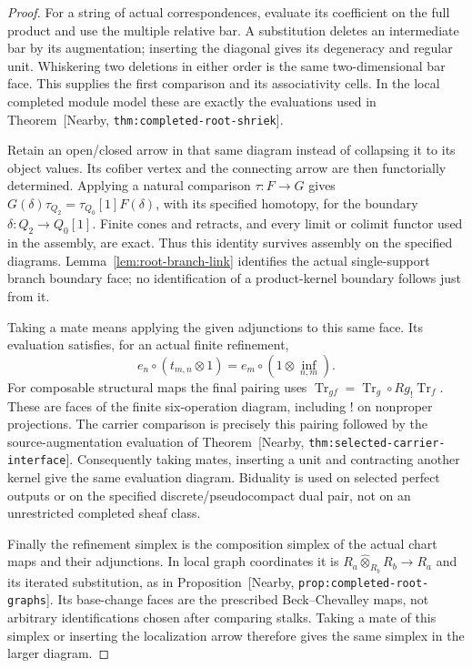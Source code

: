 \documentclass[11pt]{article}
\theoremstyle{definition}
\theoremstyle{remark}
\newcommand{\mainref}[1]{\textnormal{[Nearby, \nolinkurl{#1}]}}
\begin{document}
\begin{proof}
For a string of actual correspondences, evaluate its coefficient
on the full product and use the multiple relative bar.  A
substitution deletes an intermediate bar by its augmentation;
inserting the diagonal gives its degeneracy and regular unit.
Whiskering two deletions in either order is the same two-dimensional
bar face.  This supplies the first comparison and its associativity
cells.  In the local completed module model these are exactly the
evaluations used in Theorem~\mainref{thm:completed-root-shriek}.

Retain an open/closed arrow in that same diagram instead of
collapsing it to its object values.  Its cofiber vertex and the
connecting arrow are then functorially determined.  Applying a
natural comparison $\tau:F\to G$ gives
$G(\delta)\tau_{Q_2}=\tau_{Q_0}[1]F(\delta)$, with its specified
homotopy, for the boundary $\delta:Q_2\to Q_0[1]$.
Finite cones and retracts, and every limit or colimit functor used
in the assembly, are exact.  Thus this identity survives assembly
on the specified diagrams.  Lemma~\ref{lem:root-branch-link}
identifies the actual single-support branch boundary face; no
identification of a product-kernel boundary follows just from it.

Taking a mate means applying the given adjunctions to this same
face.  Its evaluation satisfies, for an actual finite refinement,
\[
 e_n\circ(t_{m,n}\otimes1)
       =e_m\circ(1\otimes\operatorname{inf}_{n,m}).
\]
For composable structural maps the final pairing uses
$\operatorname{Tr}_{gf}
=\operatorname{Tr}_g\circ Rg_!\operatorname{Tr}_f$.
These are faces of the finite six-operation diagram, including
$!$ on nonproper projections.  The carrier comparison is precisely
this pairing followed by the source-augmentation evaluation of
Theorem~\mainref{thm:selected-carrier-interface}.  Consequently taking
mates, inserting a unit and contracting another kernel give the
same evaluation diagram.  Biduality is used on selected perfect
outputs or on the specified discrete/pseudocompact dual pair, not
on an unrestricted completed sheaf class.

Finally the refinement simplex is the composition simplex of the
actual chart maps and their adjunctions.  In local graph coordinates
it is $R_a\widehat\otimes_{R_b}R_b\to R_a$ and its iterated
substitution, as in Proposition~\mainref{prop:completed-root-graphs}.
Its base-change faces are the prescribed Beck--Chevalley maps,
not arbitrary identifications chosen after comparing stalks.
Taking a mate of this simplex or inserting the localization arrow
therefore gives the same simplex in the larger diagram.


\end{proof}
\end{document}
